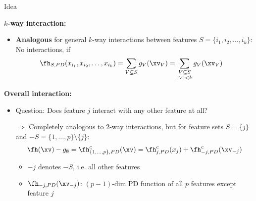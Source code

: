\documentclass[11pt,compress,t,notes=noshow, aspectratio=169, xcolor=table]{beamer}
\begin{document}
\begin{frame}{Idea }

\textbf{$k$-way interaction:}
\begin{itemize}
    \item \textbf{Analogous} for general $k$-way interactions between features $S = \{ i_1, i_2, \dots, i_k \}$: No interactions, if
    \begin{align*}
        &\fh_{S, PD}( x_{i_1}, x_{i_2}, \dots, x_{i_k} )
        = \sum_{V \subsetneq S} g_{V}(\xv_V)
        = \sum_{\substack{V \subseteq S \\ |V|<k}} g_{V}(\xv_V)
    \end{align*}
\end{itemize}
\textbf{Overall interaction:}
\begin{itemize}
    \item Question: Does feature $j$ interact with any other feature at all?
    \item[$\Rightarrow$] Completely analogous to 2-way interactions, but for feature sets $S = \{j\}$ and $-S = \{1, \dots, p\}\setminus \{j\}$: \\
    $$
    \fh(\xv) - g_\emptyset
    = \fh^c_{\{1, \dots, p\}, PD}(\xv)
    = \fh^c_{j, PD}(x_j) +  \fh^c_{-j, PD}(\xv_{-j})
    $$
    \begin{itemize}
        \item $-j$ denotes $-S$, i.e. all other features
    	\item $\fh_{-j, PD}(\xv_{-j})$: $(p-1)$-dim PD function of all $p$ features except feature $j$
    \end{itemize}
\end{itemize}
    
\end{frame}
\end{document}
